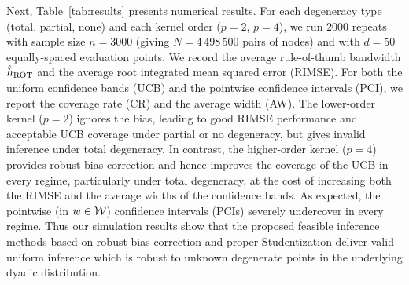 Next, Table~\ref{tab:results} presents numerical results.
For each degeneracy type (total, partial, none)
and each kernel order ($p=2$, $p=4$),
we run $2000$ repeats
with sample size $n=3000$ (giving $N=4\,498\,500$ pairs of nodes)
and with $d=50$ equally-spaced evaluation points.
We record the average rule-of-thumb bandwidth $\hat{h}_{\operatorname{ROT}}$
and the average root integrated mean squared error (RIMSE).
For both the uniform confidence bands (UCB)
and the pointwise confidence intervals (PCI),
we report the coverage rate (CR) and the average width (AW).
%
The lower-order kernel ($p=2$) ignores the bias, leading to
good RIMSE performance and acceptable UCB coverage
under partial or no degeneracy,
but gives invalid inference under total degeneracy.
In contrast, the higher-order kernel ($p=4$)
provides robust bias correction
and hence improves the coverage of the UCB in every regime,
particularly under total degeneracy,
at the cost of increasing both the RIMSE
and the average widths of the confidence bands.
%
As expected, the pointwise (in $w\in\mathcal{W}$) confidence intervals (PCIs)
severely undercover in every regime.
Thus our simulation results show that the proposed feasible
inference methods based on robust bias correction and proper Studentization
deliver valid uniform inference
which is robust to unknown degenerate points
in the underlying dyadic distribution.

